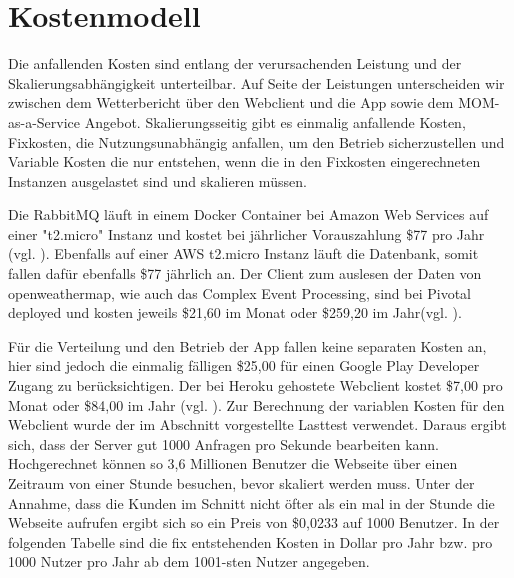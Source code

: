 \section{Kostenmodell}
Die anfallenden Kosten sind entlang der verursachenden Leistung und der Skalierungsabhängigkeit unterteilbar. Auf Seite der Leistungen unterscheiden wir zwischen dem Wetterbericht über den Webclient und die App sowie dem MOM-as-a-Service Angebot. Skalierungsseitig gibt es einmalig anfallende Kosten, Fixkosten, die Nutzungsunabhängig anfallen, um den Betrieb sicherzustellen und Variable Kosten die nur entstehen, wenn die in den Fixkosten eingerechneten Instanzen ausgelastet sind und skalieren müssen.

Die RabbitMQ läuft in einem Docker Container bei Amazon Web Services auf einer "t2.micro" Instanz und kostet bei jährlicher Vorauszahlung \$77 pro Jahr (vgl. \cite{kos:1}). Ebenfalls auf einer AWS t2.micro Instanz läuft die Datenbank, somit fallen dafür ebenfalls \$77 jährlich an. Der Client zum auslesen der Daten von openweathermap, wie auch das Complex Event Processing, sind bei Pivotal deployed und kosten jeweils \$21,60 im Monat oder \$259,20 im Jahr(vgl. \cite{kos:2}). 


Für die Verteilung und den Betrieb der App fallen keine separaten Kosten an, hier sind jedoch die einmalig fälligen \$25,00 für einen Google Play Developer Zugang zu berücksichtigen. Der bei Heroku gehostete Webclient kostet \$7,00 pro Monat oder \$84,00 im Jahr (vgl. \cite{kos:3}). Zur Berechnung der variablen Kosten für den Webclient wurde der im Abschnitt  vorgestellte Lasttest verwendet. Daraus ergibt sich, dass der Server gut 1000 Anfragen pro Sekunde bearbeiten kann. Hochgerechnet können so 3,6 Millionen Benutzer die Webseite über einen Zeitraum von einer Stunde besuchen, bevor skaliert werden muss. Unter der Annahme, dass die Kunden im Schnitt nicht öfter als ein mal in der Stunde die Webseite aufrufen ergibt sich so ein Preis von \$0,0233 auf 1000 Benutzer. In der folgenden Tabelle sind die fix entstehenden Kosten in Dollar pro Jahr bzw. pro 1000 Nutzer pro Jahr ab dem 1001-sten Nutzer angegeben.



